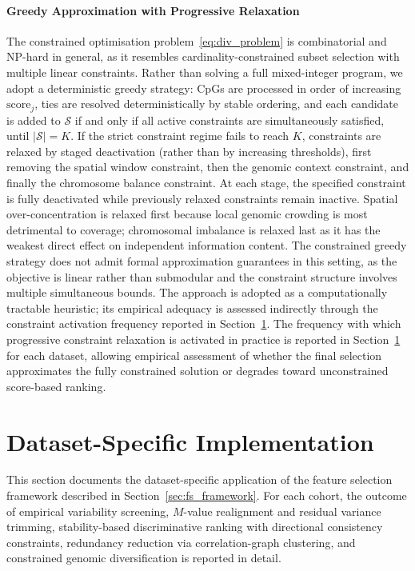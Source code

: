\paragraph{Greedy Approximation with Progressive Relaxation}

The constrained optimisation problem~\eqref{eq:div_problem} 
is combinatorial and NP-hard in general, as it resembles 
cardinality-constrained subset selection with multiple 
linear constraints. Rather than solving a full 
mixed-integer program, we adopt a deterministic greedy 
strategy: CpGs are processed in order of increasing 
$\mathrm{score}_j$, ties are resolved deterministically by stable ordering, and each candidate is added to 
$\mathcal{S}$ if and only if all active constraints are 
simultaneously satisfied, until $|\mathcal{S}| = K$.
If the strict constraint regime fails to reach $K$, constraints are relaxed by staged deactivation (rather than by increasing thresholds), first removing the spatial window constraint, then the genomic context constraint, and finally the chromosome balance constraint.
At each stage, the specified constraint is fully deactivated while 
previously relaxed constraints remain inactive.
Spatial over-concentration is relaxed first because 
local genomic crowding is most detrimental to coverage; 
chromosomal imbalance is relaxed last as it has the 
weakest direct effect on independent information content. 
The constrained greedy strategy does not admit formal 
approximation guarantees in this setting, as the objective 
is linear rather than submodular and the constraint structure 
involves multiple simultaneous bounds. The approach is adopted 
as a computationally tractable heuristic; its empirical 
adequacy is assessed indirectly through the constraint 
activation frequency reported in 
Section~\ref{sec:fs_intra_dataset}.
The frequency with which progressive constraint relaxation is activated in practice is reported in Section~\ref{sec:fs_intra_dataset} for each dataset, allowing empirical assessment of whether the final selection approximates the fully constrained solution or degrades toward unconstrained score-based ranking.

\section{Dataset-Specific Implementation}
\label{sec:fs_intra_dataset}

This section documents the dataset-specific application of the feature selection framework described in Section~\ref{sec:fs_framework}. For each cohort, the outcome of empirical variability screening, $M$-value realignment and residual variance trimming, stability-based discriminative ranking with directional consistency constraints, redundancy reduction via correlation-graph clustering, and constrained genomic diversification is reported in detail. 

